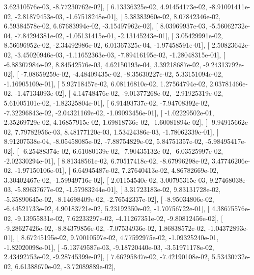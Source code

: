 \documentclass{article}
\begin{document}
          3.62310576e-03,  -8.77230762e-02],
       [  6.13336325e-02,   4.91454173e-02,  -8.91091411e-02,
         -2.81879453e-03,  -1.67518248e-01],
       [  5.38383960e-02,   8.07842346e-02,   6.59384578e-02,
          6.67683994e-02,  -3.15497962e-02],
       [  8.03969937e-03,  -5.56062732e-04,  -7.84294381e-02,
         -1.05131415e-01,  -2.13145243e-01],
       [  3.05429991e-02,   8.56696952e-02,  -2.34492986e-02,
          6.01367325e-04,  -1.97458591e-01],
       [  2.50823642e-02,  -3.45020946e-03,  -1.11652363e-03,
         -7.89416195e-02,  -1.28048315e-01],
       [ -6.88307984e-02,   8.84542576e-03,   4.62150193e-04,
          3.39218687e-02,  -9.24313792e-02],
       [ -7.08659259e-02,  -4.48409435e-02,  -8.35630227e-02,
          5.33151094e-02,  -1.16905109e-01],
       [  5.92718457e-02,   6.08116810e-02,   1.27564794e-02,
          2.03781466e-02,  -1.47134093e-02],
       [  4.14748476e-02,  -9.01377268e-02,  -2.91925319e-02,
          5.61005101e-02,  -1.82325804e-01],
       [  6.91493737e-02,  -7.94708392e-02,  -7.32296843e-02,
         -2.04321169e-02,  -1.09093456e-01],
       [ -1.02229502e-01,   2.35269729e-02,   4.16857915e-02,
          1.69818736e-02,  -1.60081894e-02],
       [ -9.94915662e-02,   7.79782956e-03,   8.48177120e-03,
          1.53424386e-03,  -1.78062339e-01],
       [  8.91207538e-04,  -8.05458085e-02,  -7.88754829e-02,
          5.84751357e-02,  -5.98495417e-02],
       [ -6.25488374e-02,   6.61080139e-02,  -7.90435132e-02,
         -6.03525997e-02,  -2.02330294e-01],
       [  8.81348561e-02,   6.70517418e-02,  -8.67996298e-02,
          3.47746206e-02,  -1.97150106e-01],
       [  6.64945487e-02,   7.27640413e-02,   4.86782669e-02,
          3.30402467e-02,  -1.59949716e-02],
       [  2.01154540e-02,   3.00795315e-03,   9.27468038e-03,
         -5.89637677e-02,  -1.57983244e-01],
       [  3.31723183e-02,   9.83131728e-02,  -5.35890645e-02,
         -8.14698409e-02,  -2.76542337e-02],
       [ -8.95034806e-02,  -6.44521733e-02,   4.90183721e-02,
          5.23192350e-02,  -1.70756722e-01],
       [  4.38675576e-02,  -9.13955831e-02,   7.62233297e-02,
         -4.11267351e-02,  -9.80812456e-02],
       [ -9.28627426e-02,  -8.84379856e-02,  -7.07534936e-02,
          1.86838572e-02,  -1.04372893e-01],
       [  8.67245195e-02,   9.70010597e-02,   4.77592975e-02,
         -1.09325240e-01,  -1.82020098e-01],
       [ -5.13749587e-03,  -9.18720440e-03,  -3.51971178e-02,
          2.43492753e-02,  -9.28745399e-02],
       [  7.66295847e-02,  -7.42190108e-02,   5.53430732e-02,
          6.61388670e-02,  -3.72089889e-02],
\end{document}

